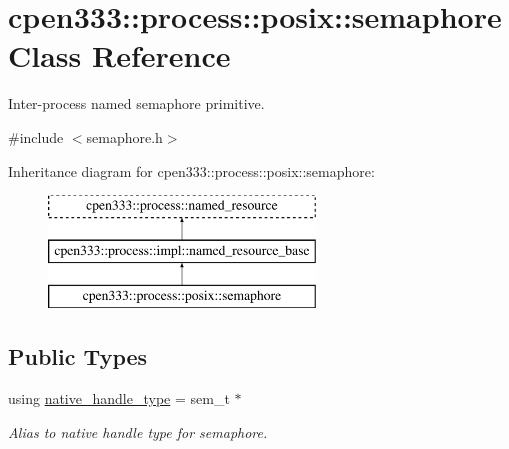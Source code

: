 \hypertarget{classcpen333_1_1process_1_1posix_1_1semaphore}{}\section{cpen333\+:\+:process\+:\+:posix\+:\+:semaphore Class Reference}
\label{classcpen333_1_1process_1_1posix_1_1semaphore}


Inter-\/process named semaphore primitive.  




{\ttfamily \#include $<$semaphore.\+h$>$}

Inheritance diagram for cpen333\+:\+:process\+:\+:posix\+:\+:semaphore\+:\begin{figure}[H]
\begin{center}
\leavevmode
\includegraphics[height=3.000000cm]{classcpen333_1_1process_1_1posix_1_1semaphore}
\end{center}
\end{figure}
\subsection*{Public Types}
\begin{DoxyCompactItemize}
\item 
using \hyperlink{classcpen333_1_1process_1_1posix_1_1semaphore_ad63150e5c8c196a84a7b214462756f1a}{native\+\_\+handle\+\_\+type} = sem\+\_\+t $\ast$
\begin{DoxyCompactList}\small\item\em Alias to native handle type for semaphore. \end{DoxyCompactList}\end{DoxyCompactItemize}
